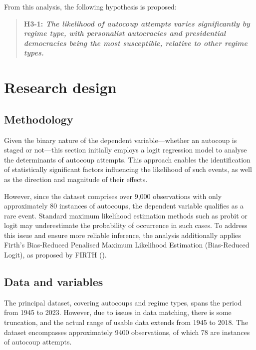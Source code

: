 \documentclass[
  12pt,
]{report}
\begin{document}
From this analysis, the following hypothesis is proposed:

\begin{quote}
\textbf{H3-1: \emph{The likelihood of autocoup attempts varies
significantly by regime type, with personalist autocracies and
presidential democracies being the most susceptible, relative to other
regime types.}}
\end{quote}

\section{Research design}\label{research-design}

\subsection*{Methodology}\label{methodology}

Given the binary nature of the dependent variable---whether an autocoup
is staged or not---this section initially employs a logit regression
model to analyse the determinants of autocoup attempts. This approach
enables the identification of statistically significant factors
influencing the likelihood of such events, as well as the direction and
magnitude of their effects.

However, since the dataset comprises over 9,000 observations with only
approximately 80 instances of autocoups, the dependent variable
qualifies as a rare event. Standard maximum likelihood estimation
methods such as probit or logit may underestimate the probability of
occurrence in such cases. To address this issue and ensure more reliable
inference, the analysis additionally applies Firth's Bias-Reduced
Penalised Maximum Likelihood Estimation (Bias-Reduced Logit), as
proposed by FIRTH ().

\subsection*{Data and variables}\label{data-and-variables}

The principal dataset, covering autocoups and regime types, spans the
period from 1945 to 2023. However, due to issues in data matching, there
is some truncation, and the actual range of usable data extends from
1945 to 2018. The dataset encompasses approximately 9400 observations,
of which 78 are instances of autocoup attempts.
\end{document}
